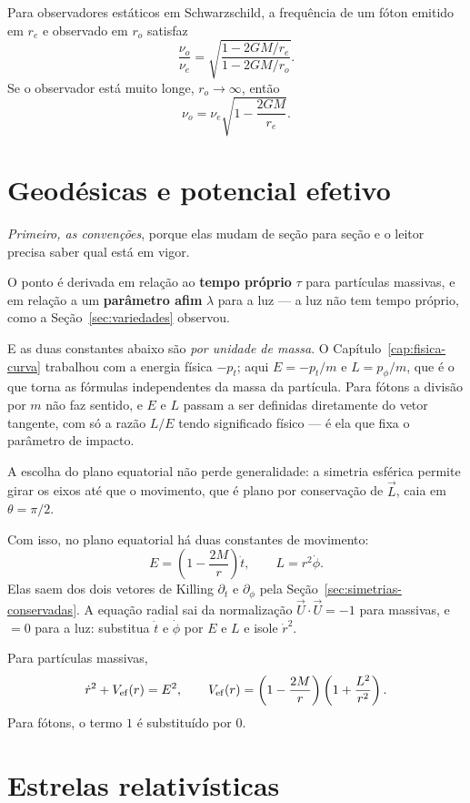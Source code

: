 \documentclass[12pt,a4paper,oneside]{book}
\theoremstyle{rgplain}
\theoremstyle{rgremark}
\begin{document}
Para observadores estáticos em Schwarzschild, a frequência de um fóton emitido
em $r_e$ e observado em $r_o$ satisfaz
\[
  \frac{\nu_o}{\nu_e}
  =
  \sqrt{
  \frac{1-2GM/r_e}{1-2GM/r_o}
  }.
\]
Se o observador está muito longe, $r_o\to\infty$, então
\[
  \nu_o=\nu_e\sqrt{1-\frac{2GM}{r_e}}.
\]

\section{Geodésicas e potencial efetivo}
\label{sec:geodesicas-potencial}

\emph{Primeiro, as convenções}, porque elas mudam de seção para seção e o
leitor precisa saber qual está em vigor.

O ponto é derivada em relação ao \textbf{tempo próprio} $\tau$ para
partículas massivas, e em relação a um \textbf{parâmetro afim} $\lambda$ para
a luz --- a luz não tem tempo próprio, como a Seção~\ref{sec:variedades}
observou.

E as duas constantes abaixo são \emph{por unidade de massa}. O
Capítulo~\ref{cap:fisica-curva} trabalhou com a energia física
$-p_t$; aqui $E=-p_t/m$ e $L=p_\phi/m$, que é o que torna as fórmulas
independentes da massa da partícula. Para fótons a divisão por $m$ não faz
sentido, e $E$ e $L$ passam a ser definidas diretamente do vetor tangente, com
só a razão $L/E$ tendo significado físico --- é ela que fixa o parâmetro de
impacto.

A escolha do plano equatorial não perde generalidade: a simetria esférica
permite girar os eixos até que o movimento, que é plano por conservação de
$\vec L$, caia em $\theta=\pi/2$.

Com isso, no plano equatorial há duas constantes de movimento:
\[
  E=\left(1-\frac{2M}{r}\right)\dot t,
  \qquad
  L=r^2\dot\phi.
\]
Elas saem dos dois vetores de Killing $\partial_t$ e $\partial_\phi$ pela
Seção~\ref{sec:simetrias-conservadas}. A equação radial sai da normalização
$\vec U\cdot\vec U=-1$ para massivas, e $=0$ para a luz: substitua $\dot t$ e
$\dot\phi$ por $E$ e $L$ e isole $\dot r^2$.

Para partículas massivas,
\[
  \dot r^2+V_{\mathrm{ef}}(r)=E^2,
  \qquad
  V_{\mathrm{ef}}(r)=\left(1-\frac{2M}{r}\right)
  \left(1+\frac{L^2}{r^2}\right).
\]
Para fótons, o termo $1$ é substituído por $0$.

\section{Estrelas relativísticas}
\label{sec:estrelas-relativisticas}
\end{document}
